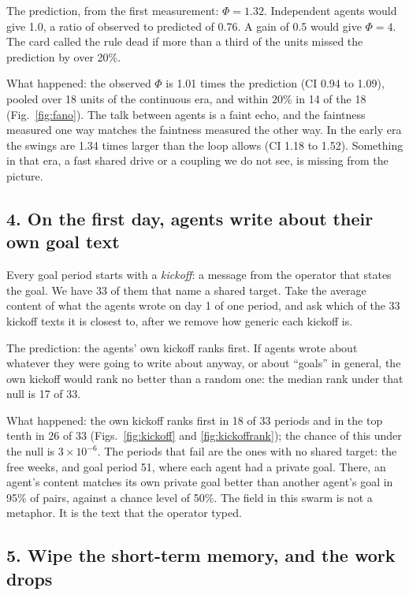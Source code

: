 The prediction, from the first measurement: $\Phi=1.32$. Independent agents would give 1.0, a ratio of observed to predicted of 0.76. A gain of 0.5 would give $\Phi=4$. The card called the rule dead if more than a third of the units missed the prediction by over 20\%.

What happened: the observed $\Phi$ is 1.01 times the prediction (CI 0.94 to 1.09), pooled over 18 units of the continuous era, and within 20\% in 14 of the 18 (Fig.~\ref{fig:fano}). The talk between agents is a faint echo, and the faintness measured one way matches the faintness measured the other way. In the early era the swings are 1.34 times larger than the loop allows (CI 1.18 to 1.52). Something in that era, a fast shared drive or a coupling we do not see, is missing from the picture.

\subsection*{4. On the first day, agents write about their own goal text}

Every goal period starts with a \emph{kickoff}: a message from the operator that states the goal. We have 33 of them that name a shared target. Take the average content of what the agents wrote on day 1 of one period, and ask which of the 33 kickoff texts it is closest to, after we remove how generic each kickoff is.

The prediction: the agents' own kickoff ranks first. If agents wrote about whatever they were going to write about anyway, or about ``goals'' in general, the own kickoff would rank no better than a random one: the median rank under that null is 17 of 33.

What happened: the own kickoff ranks first in 18 of 33 periods and in the top tenth in 26 of 33 (Figs.~\ref{fig:kickoff} and \ref{fig:kickoffrank}); the chance of this under the null is $3\times10^{-6}$. The periods that fail are the ones with no shared target: the free weeks, and goal period 51, where each agent had a private goal. There, an agent's content matches its own private goal better than another agent's goal in 95\% of pairs, against a chance level of 50\%. The field in this swarm is not a metaphor. It is the text that the operator typed.

\subsection*{5. Wipe the short-term memory, and the work drops}

